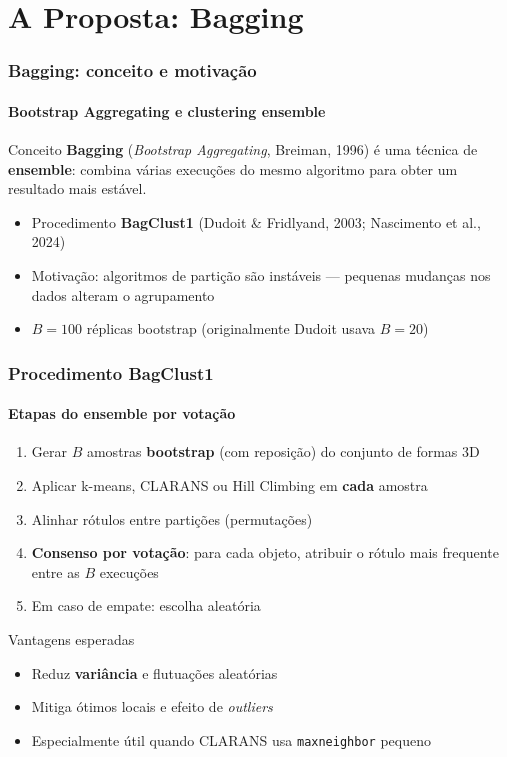 \documentclass[brazilian,11pt]{beamer}
\begin{document}
\section[Bagging]{A Proposta: Bagging}

\begin{frame}
    \frametitle{Bagging: conceito e motivação}
    \framesubtitle{Bootstrap Aggregating e clustering ensemble}

    \begin{block}{Conceito}
        \textbf{Bagging} (\textit{Bootstrap Aggregating}, Breiman, 1996) é uma técnica de \textbf{ensemble}: combina várias execuções do mesmo algoritmo para obter um resultado mais estável.
    \end{block}

    \begin{itemize}
        \item Procedimento \textbf{BagClust1} (Dudoit \& Fridlyand, 2003; Nascimento et al., 2024)
        \item Motivação: algoritmos de partição são instáveis --- pequenas mudanças nos dados alteram o agrupamento
        \item $B = 100$ réplicas bootstrap (originalmente Dudoit usava $B=20$)
    \end{itemize}
\end{frame}

\begin{frame}
    \frametitle{Procedimento BagClust1}
    \framesubtitle{Etapas do ensemble por votação}

    \begin{enumerate}
        \item Gerar $B$ amostras \textbf{bootstrap} (com reposição) do conjunto de formas 3D
        \item Aplicar k-means, CLARANS ou Hill Climbing em \textbf{cada} amostra
        \item Alinhar rótulos entre partições (permutações)
        \item \textbf{Consenso por votação}: para cada objeto, atribuir o rótulo mais frequente entre as $B$ execuções
        \item Em caso de empate: escolha aleatória
    \end{enumerate}

    \begin{alertblock}{Vantagens esperadas}
        \begin{itemize}
            \item Reduz \textbf{variância} e flutuações aleatórias
            \item Mitiga ótimos locais e efeito de \textit{outliers}
            \item Especialmente útil quando CLARANS usa \texttt{maxneighbor} pequeno
        \end{itemize}
    \end{alertblock}
\end{frame}
\end{document}
